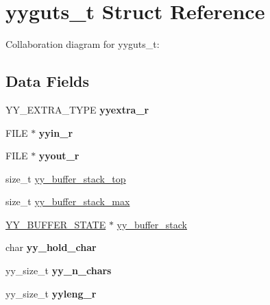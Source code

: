 \hypertarget{structyyguts__t}{
\section{yyguts\_\-t Struct Reference}
\label{structyyguts__t}
}


Collaboration diagram for yyguts\_\-t:\subsection*{Data Fields}
\begin{DoxyCompactItemize}
\item 
\hypertarget{structyyguts__t_a9f6feb2c222f0294d5d1de3a9e8cdd7b}{
YY\_\-EXTRA\_\-TYPE {\bfseries yyextra\_\-r}}
\label{structyyguts__t_a9f6feb2c222f0294d5d1de3a9e8cdd7b}

\item 
\hypertarget{structyyguts__t_a352c5f893f82f589d8dc58529e145680}{
FILE $\ast$ {\bfseries yyin\_\-r}}
\label{structyyguts__t_a352c5f893f82f589d8dc58529e145680}

\item 
\hypertarget{structyyguts__t_a1576f8f959b4083f3c9d615ee7f5bca7}{
FILE $\ast$ {\bfseries yyout\_\-r}}
\label{structyyguts__t_a1576f8f959b4083f3c9d615ee7f5bca7}

\item 
size\_\-t \hyperlink{structyyguts__t_ae54779a12769204c826899d0531e40e6}{yy\_\-buffer\_\-stack\_\-top}
\item 
size\_\-t \hyperlink{structyyguts__t_a437cdcd878686881404e320fd941929c}{yy\_\-buffer\_\-stack\_\-max}
\item 
\hyperlink{structyy__buffer__state}{YY\_\-BUFFER\_\-STATE} $\ast$ \hyperlink{structyyguts__t_a49bfb4502fc4aa7932467897ba827ecc}{yy\_\-buffer\_\-stack}
\item 
\hypertarget{structyyguts__t_a13f78e763996d2d86c85b45cbe146282}{
char {\bfseries yy\_\-hold\_\-char}}
\label{structyyguts__t_a13f78e763996d2d86c85b45cbe146282}

\item 
\hypertarget{structyyguts__t_a1b32e1eb099ce2691de57d498ec8c66f}{
yy\_\-size\_\-t {\bfseries yy\_\-n\_\-chars}}
\label{structyyguts__t_a1b32e1eb099ce2691de57d498ec8c66f}

\item 
\hypertarget{structyyguts__t_ab71976e009a98e9376ba226cc4567b8d}{
yy\_\-size\_\-t {\bfseries yyleng\_\-r}}
\label{structyyguts__t_ab71976e009a98e9376ba226cc4567b8d}


\end{DoxyCompactItemize}
